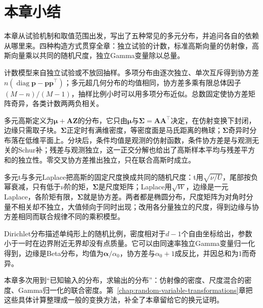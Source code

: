 \section{本章小结}
\label{sec:mvd-summary}

本章从试验机制和取值范围出发，写出了五种常见的多元分布，并追问各自的依赖从哪里来。四种构造方式贯穿全章：独立试验的计数，标准高斯向量的仿射像，高斯向量乘以共同的随机尺度，独立Gamma变量除以总量。

计数模型来自独立试验或不放回抽样。多项分布由逐次独立、单次互斥得到协方差$n(\operatorname{diag}\bm{p}-\bm{p}\bm{p}^{\top})$；多元超几何分布的均值相同，协方差多乘有限总体因子$(M-n)/(M-1)$，抽样比例小时可以用多项分布近似。总数固定使协方差矩阵奇异，各类计数两两负相关。

多元高斯定义为$\bm{\mu}+\bm{A}\bm{Z}$的分布，它只由$\bm{\mu}$与$\bm{\Sigma}=\bm{A}\bm{A}^{\top}$决定，在仿射变换下封闭，边缘只需取子块。$\bm{\Sigma}$正定时有满维密度，等密度面是马氏距离的椭球；$\bm{\Sigma}$奇异时分布落在低维平面上。分块后，条件均值是观测的仿射函数，条件协方差是与观测无关的Schur补；残差与观测独立，这一正交分解也给出了高斯样本平均与残差平方和的独立性。零交叉协方差推出独立，只在联合高斯时成立。

多元t与多元Laplace把高斯的固定尺度换成共同的随机尺度：t用$\sqrt{\nu/U}$，尾部按负幂衰减，只有低于$\nu$阶的矩，$\bm{\Sigma}$是尺度矩阵；Laplace用$\sqrt W$，边缘是一元Laplace，各阶矩有限，$\bm{\Sigma}$就是协方差。两者都是椭圆分布，尺度矩阵为对角时分量不相关却不独立，大值倾向于同时出现；改用各分量独立的尺度，得到边缘与协方差相同而联合规律不同的乘积模型。

Dirichlet分布描述单纯形上的随机比例，密度相对于$d-1$个自由坐标给出，参数小于一时在边界附近无界却没有点质量。它可以由同速率独立Gamma变量归一化得到，边缘是Beta分布，均值为$\bm{\alpha}/\alpha_0$，协方差与$\alpha_0+1$成反比，并因总和为$1$而奇异。

本章多次用到“已知输入的分布，求输出的分布”：仿射像的密度、尺度混合的密度、Gamma归一化的联合密度。第~\ref{chap:random-variable-transformations}章把这些具体计算整理成一般的变换方法，补全了本章留给它的换元证明。

